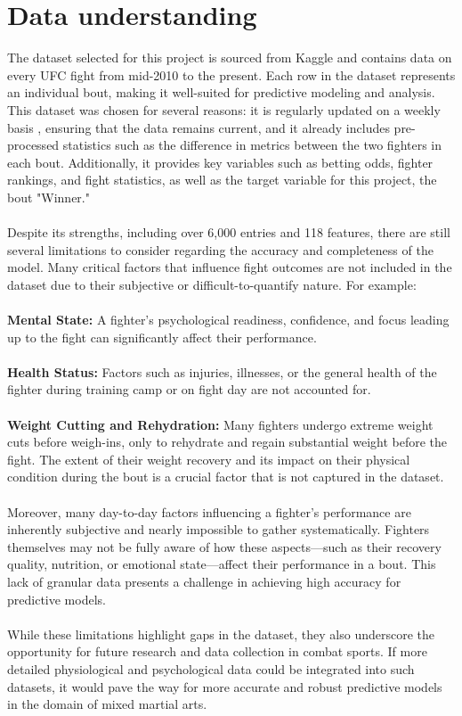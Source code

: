 \documentclass{article}
\begin{document}
	\section{Data understanding}
	The dataset selected for this project is sourced from Kaggle and contains data on every UFC fight from mid-2010 to the present. Each row in the dataset represents 
  an individual bout, making it well-suited for predictive modeling and analysis. This dataset was chosen for several reasons: it is regularly updated on a weekly basis
  , ensuring that the data remains current, and it already includes pre-processed statistics such as the difference in metrics between the two fighters in each bout. 
  Additionally, it provides key variables such as betting odds, fighter rankings, and fight statistics, as well as the target variable for this project, the bout
  "Winner." \\\\
  Despite its strengths, including over 6,000 entries and 118 features, there are still several limitations to consider regarding the accuracy and completeness of
  the model. Many critical factors that influence fight outcomes are not included in the dataset due to their subjective or difficult-to-quantify nature. 
  For example:\\\\
  \textbf{Mental State: }A fighter's psychological readiness, confidence, and focus leading up to the fight can significantly affect their performance. \\\\
  \textbf{Health Status: } Factors such as injuries, illnesses, or the general health of the fighter during training camp or on fight day are not accounted for.\\\\
  \textbf{Weight Cutting and Rehydration: } Many fighters undergo extreme weight cuts before weigh-ins, only to rehydrate and regain substantial weight before the fight. 
  The extent of their weight recovery and its impact on their physical condition during the bout is a crucial factor that is not captured in the dataset.\\\\
  Moreover, many day-to-day factors influencing a fighter's performance are inherently subjective and nearly impossible to gather systematically. Fighters
  themselves may not be fully aware of how these aspects—such as their recovery quality, nutrition, or emotional state—affect their performance in a bout.
  This lack of granular data presents a challenge in achieving high accuracy for predictive models.\\\\
  While these limitations highlight gaps in the dataset, they also underscore the opportunity for future research and data collection in combat sports. 
  If more detailed physiological and psychological data could be integrated into such datasets, it would pave the way for more accurate and robust predictive models
  in the domain of mixed martial arts.\\\\
\end{document}
